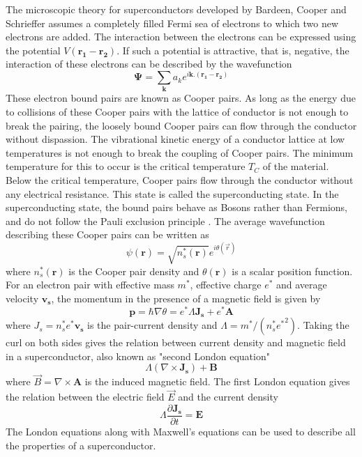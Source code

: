 \documentclass[letterpaper,english,reprint, aps]{revtex4}
\begin{document}
The microscopic theory for superconductors developed by Bardeen, Cooper and Schrieffer assumes a completely filled Fermi sea of electrons to which two new electrons are added. The interaction between the electrons can be expressed using the potential $V(\boldsymbol{r_1} - \boldsymbol{r_2})$. If such a potential is attractive, that is, negative, the interaction of these electrons can be described by the wavefunction
\begin{equation}
    \mathbf{\Psi} = \sum_{\boldsymbol{k}} a_k e^{i\boldsymbol{k}.(\boldsymbol{r_1} - \boldsymbol{r_2})}
\end{equation}
These electron bound pairs are known as Cooper pairs. As long as the energy due to collisions of these Cooper pairs with the lattice of conductor is not enough to break the pairing, the loosely bound Cooper pairs can flow through the conductor without dispassion. The vibrational kinetic energy of a conductor lattice at low temperatures is not enough to break the coupling of Cooper pairs. The minimum temperature for this to occur is the critical temperature $T_C$ of the material. Below the critical temperature, Cooper pairs flow through the conductor without any electrical resistance. This state is called the superconducting state. In the superconducting state, the bound pairs behave as Bosons rather than Fermions, and do not follow the Pauli exclusion principle \citep{vanduzer,fermi_gas,feynman}. The average wavefunction describing these Cooper pairs can be written as 
\begin{equation}
    \psi(\boldsymbol{r}) = \sqrt{n_s^*(\boldsymbol{r})}e^{i\theta(\Vec{r})}
\end{equation}
where $n_s^*(\boldsymbol{r})$ is the Cooper pair density and $\theta(\boldsymbol{r})$ is a scalar position function. For an electron pair with effective mass $m^*$, effective charge $e^*$ and average velocity $\boldsymbol{v_s}$, the momentum in the presence of a magnetic field is given by
\begin{equation}
    \boldsymbol{p} = \hbar \nabla \theta = e^*\Lambda \boldsymbol{J_s} + e^*\boldsymbol{A} 
\end{equation}
where $J_s = n_s^* e^* \boldsymbol{v_s}$ is the pair-current density and $\Lambda = m^*/(n_s^* {e^*}^2)$. Taking the curl on both sides gives the relation between current density and magnetic field in a superconductor, also known as "second London equation" \citep{london_paper}
\begin{equation}
    \Lambda(\nabla \times \boldsymbol{J_s} ) + \boldsymbol{B} \label{eq:second_london}
\end{equation}
where $\Vec{B} = \nabla \times \boldsymbol{A}$ is the induced magnetic field. The first London equation gives the relation between the electric field $\Vec{E}$ and the current density 
\begin{equation}
    \Lambda \frac{\partial\boldsymbol{J_s}}{\partial t} = \boldsymbol{E}
\end{equation}
The London equations along with Maxwell's equations can be used to describe all the properties of a superconductor. 
\end{document}
